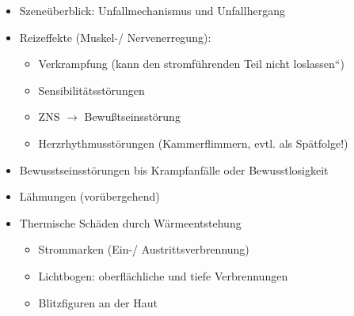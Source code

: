 {%
\begin{itemize}
  \item Szeneüberblick: Unfallmechanismus und Unfallhergang
  \item Reizeffekte (Muskel-/ Nervenerregung):
  \begin{itemize}
    \item Verkrampfung ({\quotedblbase}kann den stromführenden Teil nicht
    loslassen{\textquotedblleft})
    \item Sensibilitätsstörungen
    \item ZNS ${\rightarrow}$ Bewußtseinsstörung
    \item Herzrhythmusstörungen (Kammerflimmern, evtl.  als Spätfolge!)
  \end{itemize}
  \item Bewusstseinsstörungen bis Krampfanfälle oder Bewusstlosigkeit
  \item Lähmungen (vorübergehend)
  \item Thermische Schäden durch Wärmeentstehung
  \begin{itemize}
    \item Strommarken (Ein-/ Austrittsverbrennung)
    \item Lichtbogen: oberflächliche und tiefe  Verbrennungen
    \item Blitzfiguren an der Haut
  \end{itemize}
\end{itemize}



}
